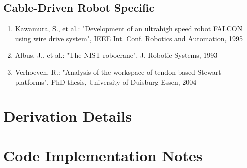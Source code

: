 \documentclass[11pt,a4paper]{article}
\begin{document}
\subsection{Cable-Driven Robot Specific}
\begin{enumerate}
\item Kawamura, S., et al.: "Development of an ultrahigh speed robot FALCON using wire drive system", IEEE Int. Conf. Robotics and Automation, 1995
\item Albus, J., et al.: "The NIST robocrane", J. Robotic Systems, 1993
\item Verhoeven, R.: "Analysis of the workspace of tendon-based Stewart platforms", PhD thesis, University of Duisburg-Essen, 2004
\end{enumerate}





\section{Derivation Details}

\section{Code Implementation Notes}
\end{document}

